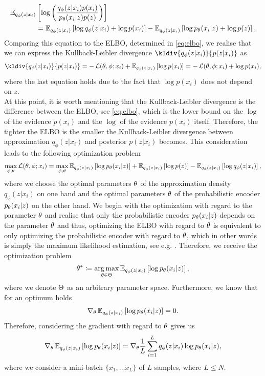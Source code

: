 \begin{align*}
\operatorname{\mathbb{E}}_{q_{\phi}(z|x_i)} &\left[ \log \left( \frac{q_{\phi}(z|x_i)p(x_i)}{p_{\theta}(x_i| z)p(z)} \right) \right]\\
&= \operatorname{\mathbb{E}}_{q_{\phi}(z|x_i)} \left[ \log q_{\phi}(z|x_i) + \log p(x_i)  \right] - \operatorname{\mathbb{E}}_{q_{\phi}(z|x_i)} \left[ \log p_{\theta}(x_i| z) + \log p(z)\right].
\end{align*}
Comparing this equation to the ELBO, determined in \eqref{eq:elbo}, we realise that we can express the Kullback-Leibler divergence $\kldiv{q_{\phi}(z|x_i)}{p(z|x_i)}$ as
\begin{align*}
\kldiv{q_{\phi}(z|x_i)}{p(z|x_i)} = - \loss(\t, \phi; x_i) + \E_{q_{\phi}(z|x_i)} \left[ \log p(x_i) \right] = - \loss(\t, \phi; x_i) + \log p(x_i),
\end{align*}
where the last equation holds due to the fact that $\log p(x_i)$ does not depend on $z$.\\
At this point, it is worth mentioning that the Kullback-Leibler divergence is the difference between the ELBO, see \eqref{eq:elbo}, which is the lower bound on the $\log$ of the evidence $p(x_i)$ and the $\log$ of the evidence $p(x_i)$ itself. Therefore, the tighter the ELBO is the smaller the Kullback-Leibler divergence between approximation $q_{\phi}(z|x_i)$ and posterior $p(z|x_i)$ becomes. This consideration leads to the following optimization problem
\begin{align*}
\max_{\phi, \theta} \operatorname{\mathcal{L}}(\theta, \phi; x_i) = \max_{\phi, \theta} \operatorname{\mathbb{E}}_{q_{\phi}(z|x_i)} \left[ \log p_{\theta}(x_i|z) \right] + \operatorname{\mathbb{E}}_{q_{\phi}(z|x_i)} \left[ \log p(z) \right] - \operatorname{\mathbb{E}}_{q_{\phi}(z|x_i)} \left[ \log q_{\phi}(z|x_i)\right],
\end{align*}
where we choose the optimal parameters $\theta$ of the approximation density $q_{\phi}(z|x_i)$ on one hand and the optimal parameters $\theta$ of the probabilistic encoder $p_{\theta}(x_i|z)$ on the other hand. We begin with the optimization with regard to the parameter $\theta$ and realise that only the probabilistic encoder $p_{\theta}(x_i|z)$ depends on the parameter $\theta$ and thus, optimizing the ELBO with regard to $\theta$ is equivalent to only optimizing the probabilistic encoder with regard to $\theta$, which in other words is simply the maximum likelihood estimation, see e.g. \cite[Section~2.3.4]{bishop2006pattern}. Therefore, we receive the optimization problem
\begin{align*}
\theta^{\ast} \coloneqq \operatorname*{arg\,max}_{\theta\in \operatorname{\Theta}} \operatorname{\mathbb{E}}_{q_{\phi}(z|x_i)} \left[ \log p_{\theta}(x_i|z) \right],
\end{align*}
where we denote $\operatorname{\Theta}$ as an arbitrary parameter space. Furthermore, we know that for an optimum holds
\begin{align*}
\nabla_{\theta}\operatorname{\mathbb{E}}_{q_{\phi}(z|x_i)} \left[ \log p_{\theta}(x_i|z) \right] = 0.
\end{align*}
Therefore, considering the gradient with regard to $\theta$ gives us
\begin{align*}
\nabla_{\theta}\operatorname{\mathbb{E}}_{q_{\phi}(z|x_i)} \left[ \log p_{\theta}(x_i|z) \right] = \nabla_{\theta} \frac{1}{L} \sum_{i=1}^{L} q_{\phi}(z|x_i) \log p_{\theta}(x_i|z),
\end{align*}
where we consider a mini-batch $\{x_1,\ldots x_L\}$ of $L$ samples, where $L\leq N$.


